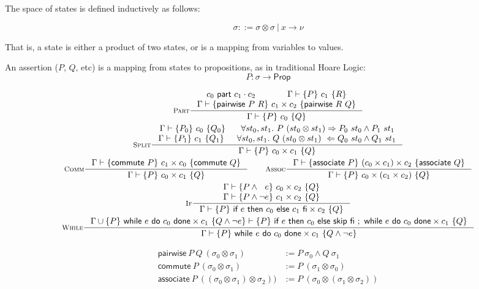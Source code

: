 \documentclass{article}
\newcommand{\triple}[3]{\{#1\}~#2~\{#3\}}
\newcommand{\ppart}[3]{#1~\textsf{part}~#2\cdot#3}
\newcommand{\judges}{\vdash}
\newcommand{\judgement}[4]{#1 \judges \triple{#2}{#3}{#4}}
\newcommand{\cif}[3]{\textsf{if}~#1~\textsf{then}~#2~\textsf{else}~#3~\textsf{fi}}
\newcommand{\cwhile}[2]{\textsf{while}~#1~\textsf{do}~#2~\textsf{done}}
\newcommand{\cskip}{\textsf{skip}}
\newcommand{\commute}{\textsf{commute}}
\newcommand{\associate}{\textsf{associate}}
\newcommand{\pairwise}{\textsf{pairwise}}
\begin{document}
The space of states is defined inductively as follows:

\[ \sigma ::= \sigma \otimes \sigma~|~x \rightarrow \nu \]

That is, a state is either a product of two states, or is a mapping from
variables to values.

An assertion ($P$, $Q$, etc) is a mapping from states to propositions,
as in traditional Hoare Logic:
\[P : \sigma \rightarrow \textsf{Prop}\]

\begin{spreadlines}{10pt}
\begin{gather*}
  \inference[\textsc{Part}]{%
    \ppart{c_0}{c_1}{c_2}&
    \judgement{\Gamma}{P}{c_1}{R}\\
    \judgement{\Gamma}{\pairwise~P~R}{c_1 \times c_2}{\pairwise~R~Q}
  }{%
    \judgement{\Gamma}{P}{c_0}{Q}
  }
  \\
  \inference[\textsc{Split}]{%
    \judgement{\Gamma}{P_0}{c_0}{Q_0}&
    \forall st_0, st_1.~P~(st_0 \otimes st_1) \Rightarrow P_0~st_0 \land P_1~st_1\\
    \judgement{\Gamma}{P_1}{c_1}{Q_1}&
    \forall st_0, st_1.~Q~(st_0 \otimes st_1) ~\Leftarrow Q_0~st_0 \land Q_1~st_1\\
  }{%
    \judgement{\Gamma}{P}{c_0 \times c_1}{Q}
  }
  \\
  \inference[\textsc{Comm}]{%
    \judgement{\Gamma}{\commute~P}{c_1 \times c_0}{\commute~Q}
  }{%
    \judgement{\Gamma}{P}{c_0 \times c_1}{Q}
  }
  \qquad
  \inference[\textsc{Assoc}]{%
    \judgement{\Gamma}{\associate~P}{(c_0 \times c_1) \times c_2}{\associate~Q}
  }{%
    \judgement{\Gamma}{P}{c_0 \times (c_1 \times c_2)}{Q}
  }
  \\
  \inference[$\textsc{If}$]{%
    \judgement{\Gamma}{P \land ~~e}{c_0 \times c_2}{Q}\\
    \judgement{\Gamma}{P \land \neg e}{c_1 \times c_2}{Q}
  }{%
    \judgement{\Gamma}{P}{\cif{e}{c_0}{c_1} \times c_2}{Q}
  }
  \\
  \inference[$\textsc{While}$]{%
    \judgement{%
      \Gamma \cup \triple{P}{\cwhile{e}{c_0} \times c_1}{Q \land \neg e}
    }{P}{\cif{e}{c_0}{\cskip}~;~\cwhile{e}{c_0} \times c_1}{Q}
  }{%
    \judgement{\Gamma}{P}{\cwhile{e}{c_0} \times c_1}{Q \land \neg e}
  }
\end{gather*}
\end{spreadlines}

\begin{align*}
  \pairwise~P~Q~(\sigma_0\otimes\sigma_1) &:= P~\sigma_0 \land Q~\sigma_1\\
  \commute~P~(\sigma_0 \otimes \sigma_1) &:= P~(\sigma_1 \otimes \sigma_0)\\
  \associate~P~((\sigma_0 \otimes \sigma_1) \otimes \sigma_2)) &:=
    P~(\sigma_0 \otimes (\sigma_1 \otimes \sigma_2))
\end{align*}
\end{document}
